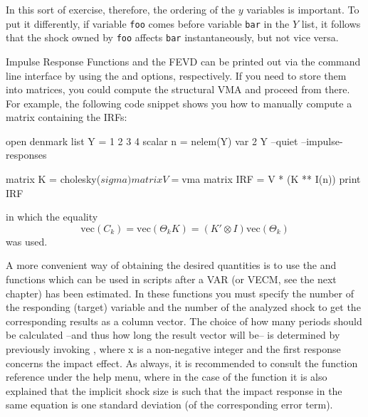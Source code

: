 In this sort of exercise, therefore, the ordering of the $y$ variables
is important.
To put it
differently, if variable \texttt{foo} comes before variable
\texttt{bar} in the $Y$ list, it follows that the shock owned by
\texttt{foo} affects \texttt{bar} instantaneously, but not
vice versa.

Impulse Response Functions and the FEVD can be printed out via the
command line interface by using the  and
 options, respectively. If you need to store
them into matrices, you could compute the structural VMA and proceed
from there. For example, the following code snippet shows you how to
manually compute a matrix containing the IRFs:
\begin{code}
open denmark
list Y = 1 2 3 4
scalar n = nelem(Y)
var 2 Y --quiet --impulse-responses

matrix K = cholesky($sigma)
matrix V = $vma
matrix IRF = V * (K ** I(n))
print IRF
\end{code}
in which the equality
\[
\mathrm{vec}(C_k) = \mathrm{vec}(\Theta_k K) = (K' \otimes I)
\mathrm{vec} (\Theta_k)
\]
was used.

A more convenient way of obtaining the desired quantities is to use the 
 and  functions which can be used in scripts after
a VAR (or VECM, see the next chapter) has been estimated. In these functions
you must specify the number of the responding (target) variable and the number 
of the analyzed shock to get the corresponding results as a column vector. The 
choice of how many periods should be calculated --and thus how long the result
vector will be-- is determined by previously invoking , where
x is a non-negative integer and the first response concerns the impact effect.
As always, it is recommended to consult the function reference under the 
help menu, where in the case of the  function it is also explained that
the implicit shock size is such that the impact response in the same equation
is one standard deviation (of the corresponding error term).

